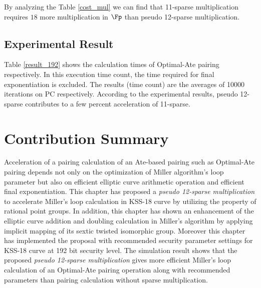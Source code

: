 By analyzing the Table \ref{cost_mul} we can find that  11-sparse multiplication requires $18$ more multiplication in $\Fp$ than pseudo 12-sparse multiplication.
\subsection{Experimental Result}
Table \ref{result_192} shows the calculation times of Optimal-Ate pairing respectively. In this execution time count, the time required for final exponentiation is excluded. The results (time count) are the averages of 10000 iterations on PC respectively. According to the experimental results, pseudo 12-sparse contributes to a few percent acceleration of 11-sparse.
\renewcommand{\baselinestretch}{1.5}
\begin{table}[h]
	\begin{center}
		\caption{Calculation time of Optimal-Ate pairing at the 192-bit security level.}
		\label{result_192}
	\end{center}
\end{table}
\renewcommand{\baselinestretch}{1.0}

\section{Contribution Summary}
Acceleration of a pairing calculation of an Ate-based pairing such as Optimal-Ate pairing depends not only on the optimization of Miller algorithm's loop parameter but also on efficient elliptic curve arithmetic operation and efficient final exponentiation. 
This chapter has proposed a \textit{pseudo 12-sparse multiplication} to accelerate Miller's loop calculation in KSS-18 curve by utilizing the property of  rational point groups.
In addition, this chapter has shown an enhancement of the elliptic curve addition and doubling calculation in Miller's algorithm by applying implicit mapping of its sextic twisted isomorphic group. 
Moreover this chapter has implemented the proposal with recommended security parameter settings for KSS-18 curve at 192 bit security level.
The simulation result shows that the proposed \textit{pseudo 12-sparse multiplication} gives more efficient Miller's loop calculation of an Optimal-Ate pairing operation along with recommended parameters than pairing calculation without sparse multiplication.

